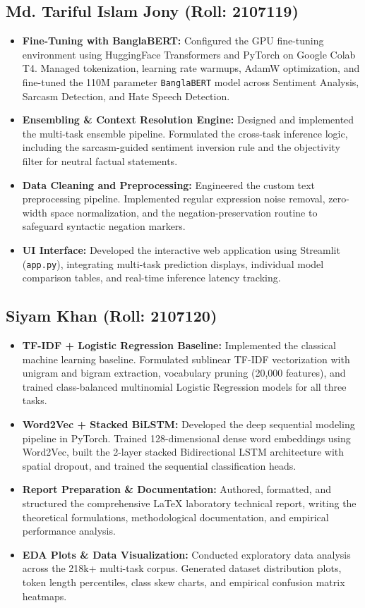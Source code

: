 \documentclass[11pt,a4paper]{article}
\begin{document}
\subsection{Md. Tariful Islam Jony (Roll: 2107119)}
\begin{itemize}[leftmargin=*]
    \item \textbf{Fine-Tuning with BanglaBERT:} Configured the GPU fine-tuning environment using HuggingFace Transformers and PyTorch on Google Colab T4. Managed tokenization, learning rate warmups, AdamW optimization, and fine-tuned the 110M parameter \texttt{BanglaBERT} model across Sentiment Analysis, Sarcasm Detection, and Hate Speech Detection.
    \item \textbf{Ensembling \& Context Resolution Engine:} Designed and implemented the multi-task ensemble pipeline. Formulated the cross-task inference logic, including the sarcasm-guided sentiment inversion rule and the objectivity filter for neutral factual statements.
    \item \textbf{Data Cleaning and Preprocessing:} Engineered the custom text preprocessing pipeline. Implemented regular expression noise removal, zero-width space normalization, and the negation-preservation routine to safeguard syntactic negation markers.
    \item \textbf{UI Interface:} Developed the interactive web application using Streamlit (\texttt{app.py}), integrating multi-task prediction displays, individual model comparison tables, and real-time inference latency tracking.
\end{itemize}

\subsection{Siyam Khan (Roll: 2107120)}
\begin{itemize}[leftmargin=*]
    \item \textbf{TF-IDF + Logistic Regression Baseline:} Implemented the classical machine learning baseline. Formulated sublinear TF-IDF vectorization with unigram and bigram extraction, vocabulary pruning (20,000 features), and trained class-balanced multinomial Logistic Regression models for all three tasks.
    \item \textbf{Word2Vec + Stacked BiLSTM:} Developed the deep sequential modeling pipeline in PyTorch. Trained 128-dimensional dense word embeddings using Word2Vec, built the 2-layer stacked Bidirectional LSTM architecture with spatial dropout, and trained the sequential classification heads.
    \item \textbf{Report Preparation \& Documentation:} Authored, formatted, and structured the comprehensive LaTeX laboratory technical report, writing the theoretical formulations, methodological documentation, and empirical performance analysis.
    \item \textbf{EDA Plots \& Data Visualization:} Conducted exploratory data analysis across the 218k+ multi-task corpus. Generated dataset distribution plots, token length percentiles, class skew charts, and empirical confusion matrix heatmaps.
\end{itemize}
\end{document}
